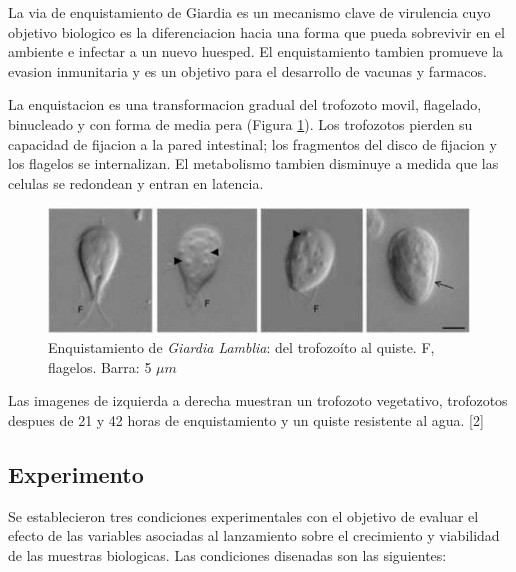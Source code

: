     La via de enquistamiento de Giardia es un mecanismo clave de virulencia cuyo objetivo
    biologico es la diferenciacion hacia una forma que pueda sobrevivir en el ambiente e infectar
    a un nuevo huesped. El enquistamiento tambien promueve la evasion inmunitaria y es un
    objetivo para el desarrollo de vacunas y farmacos.

    La enquistacion es una transformacion gradual
    del trofozoto movil, flagelado, binucleado y con forma de media pera (Figura \ref{fig:enquistamiento}).
    Los trofozotos pierden su capacidad de fijacion a la pared intestinal; los fragmentos del disco de
    fijacion y los flagelos se internalizan. El metabolismo tambien disminuye a medida que las celulas
    se redondean y entran en latencia.

    \begin{figure}[H]
      \centering
      \includegraphics[width=1\textwidth]{./image/Giardia/Enquistamiento.jpg}
      \caption{Enquistamiento de \textit{Giardia Lamblia}: del trofozoíto al quiste. F, flagelos. Barra: 5 $\mu m$}
      \label{fig:enquistamiento}
    \end{figure}

    Las imagenes de izquierda a derecha muestran un trofozoto vegetativo, trofozotos despues de 21 y
    42 horas de enquistamiento y un quiste resistente al agua. [2]

  \subsection{Experimento}
    Se establecieron tres condiciones experimentales con el objetivo de evaluar el efecto de las
    variables asociadas al lanzamiento sobre el crecimiento y viabilidad de las muestras biologicas.
    Las condiciones disenadas son las siguientes:
 
